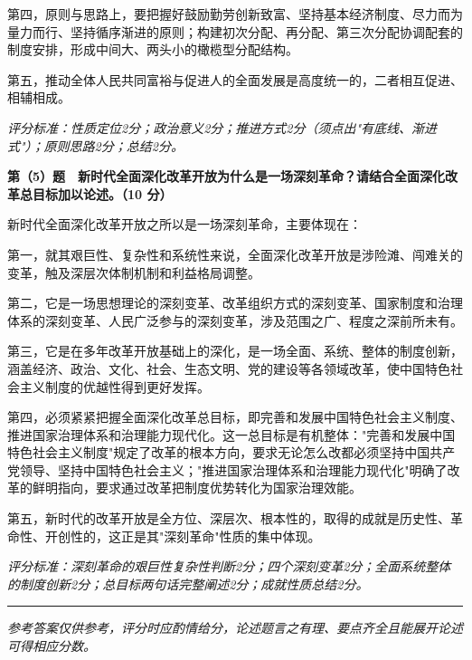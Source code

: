 \documentclass[12pt, a4paper]{article}
\newcommand{\examrule}{\noindent\rule{\linewidth}{0.6pt}}
\begin{document}
\begin{answerbox}
第四，原则与思路上，要把握好鼓励勤劳创新致富、坚持基本经济制度、尽力而为量力而行、坚持循序渐进的原则；构建初次分配、再分配、第三次分配协调配套的制度安排，形成中间大、两头小的橄榄型分配结构。

第五，推动全体人民共同富裕与促进人的全面发展是高度统一的，二者相互促进、相辅相成。

\textit{评分标准：性质定位2分；政治意义2分；推进方式2分（须点出"有底线、渐进式"）；原则思路2分；总结2分。}

\vspace{6pt}
\textbf{第（5）题　新时代全面深化改革开放为什么是一场深刻革命？请结合全面深化改革总目标加以论述。（10 分）}

新时代全面深化改革开放之所以是一场深刻革命，主要体现在：

第一，就其艰巨性、复杂性和系统性来说，全面深化改革开放是涉险滩、闯难关的变革，触及深层次体制机制和利益格局调整。

第二，它是一场思想理论的深刻变革、改革组织方式的深刻变革、国家制度和治理体系的深刻变革、人民广泛参与的深刻变革，涉及范围之广、程度之深前所未有。

第三，它是在多年改革开放基础上的深化，是一场全面、系统、整体的制度创新，涵盖经济、政治、文化、社会、生态文明、党的建设等各领域改革，使中国特色社会主义制度的优越性得到更好发挥。

第四，必须紧紧把握全面深化改革总目标，即完善和发展中国特色社会主义制度、推进国家治理体系和治理能力现代化。这一总目标是有机整体："完善和发展中国特色社会主义制度"规定了改革的根本方向，要求无论怎么改都必须坚持中国共产党领导、坚持中国特色社会主义；"推进国家治理体系和治理能力现代化"明确了改革的鲜明指向，要求通过改革把制度优势转化为国家治理效能。

第五，新时代的改革开放是全方位、深层次、根本性的，取得的成就是历史性、革命性、开创性的，这正是其"深刻革命"性质的集中体现。

\textit{评分标准：深刻革命的艰巨性复杂性判断2分；四个深刻变革2分；全面系统整体的制度创新2分；总目标两句话完整阐述2分；成就性质总结2分。}

\end{answerbox}

\vspace{12pt}
\examrule
\begin{center}
  \textit{参考答案仅供参考，评分时应酌情给分，论述题言之有理、要点齐全且能展开论述可得相应分数。}
\end{center}
\end{document}
